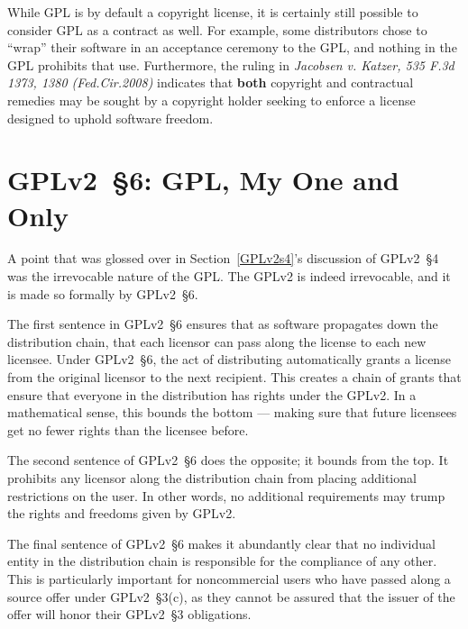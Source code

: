 While GPL is by default a copyright license, it is certainly still possible
to consider GPL as a contract as well.  For example, some distributors chose
to ``wrap'' their software in an acceptance ceremony to the GPL, and nothing in
the GPL prohibits that use.  Furthermore, the ruling in \textit{Jacobsen
  v. Katzer, 535 F.3d 1373, 1380 (Fed.Cir.2008)} indicates that \textbf{both}
copyright and contractual remedies may be sought by a copyright holder
seeking to enforce a license designed to uphold software freedom.



\section{GPLv2~\S6: GPL, My One and Only}
\label{GPLv2s6}

A point that was glossed over in Section~\ref{GPLv2s4}'s discussion of GPLv2~\S4
was the irrevocable nature of the GPL\@. The GPLv2 is indeed irrevocable,
and it is made so formally by GPLv2~\S6.

The first sentence in GPLv2~\S6 ensures that as software propagates down the
distribution chain, that each licensor can pass along the license to each
new licensee.  Under GPLv2~\S6, the act of distributing automatically grants a
license from the original licensor to the next recipient.  This creates a
chain of grants that ensure that everyone in the distribution has rights
under the GPLv2\@.  In a mathematical sense, this bounds the bottom ---
making sure that future licensees get no fewer rights than the licensee before.

The second sentence of GPLv2~\S6 does the opposite; it bounds from the top.  It
prohibits any licensor along the distribution chain from placing
additional restrictions on the user.  In other words, no additional
requirements may trump the rights and freedoms given by GPLv2\@.

The final sentence of GPLv2~\S6 makes it abundantly clear that no individual
entity in the distribution chain is responsible for the compliance of any
other.  This is particularly important for noncommercial users who have
passed along a source offer under GPLv2~\S3(c), as they cannot be assured that
the issuer of the offer will honor their GPLv2~\S3 obligations.


